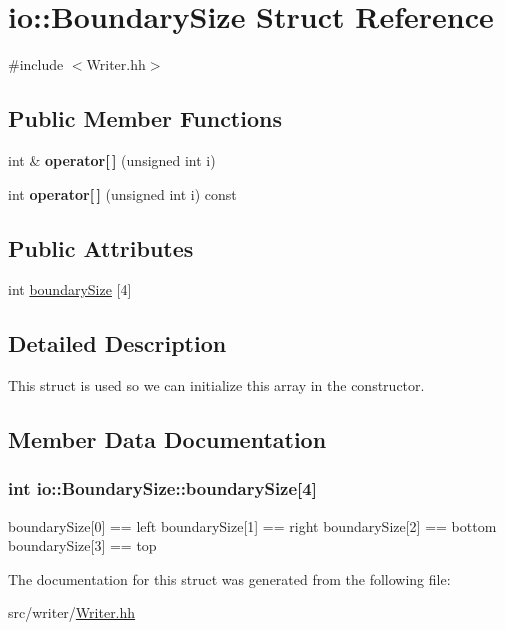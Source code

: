 \hypertarget{structio_1_1BoundarySize}{\section{io\-:\-:Boundary\-Size Struct Reference}
\label{structio_1_1BoundarySize}
}


{\ttfamily \#include $<$Writer.\-hh$>$}

\subsection*{Public Member Functions}
\begin{DoxyCompactItemize}
\item 
\hypertarget{structio_1_1BoundarySize_a4130ec88292d4a0eff9c402a90ef907d}{int \& {\bfseries operator\mbox{[}$\,$\mbox{]}} (unsigned int i)}\label{structio_1_1BoundarySize_a4130ec88292d4a0eff9c402a90ef907d}

\item 
\hypertarget{structio_1_1BoundarySize_ab7593d2a82890d5d255c30d1dd8fee08}{int {\bfseries operator\mbox{[}$\,$\mbox{]}} (unsigned int i) const }\label{structio_1_1BoundarySize_ab7593d2a82890d5d255c30d1dd8fee08}

\end{DoxyCompactItemize}
\subsection*{Public Attributes}
\begin{DoxyCompactItemize}
\item 
int \hyperlink{structio_1_1BoundarySize_ae1ac1aecc0b840076b68948dc2ceba8a}{boundary\-Size} \mbox{[}4\mbox{]}
\end{DoxyCompactItemize}


\subsection{Detailed Description}
This struct is used so we can initialize this array in the constructor. 

\subsection{Member Data Documentation}
\hypertarget{structio_1_1BoundarySize_ae1ac1aecc0b840076b68948dc2ceba8a}{
\subsubsection[{boundary\-Size}]{\setlength{\rightskip}{0pt plus 5cm}int io\-::\-Boundary\-Size\-::boundary\-Size\mbox{[}4\mbox{]}}}\label{structio_1_1BoundarySize_ae1ac1aecc0b840076b68948dc2ceba8a}
boundary\-Size\mbox{[}0\mbox{]} == left boundary\-Size\mbox{[}1\mbox{]} == right boundary\-Size\mbox{[}2\mbox{]} == bottom boundary\-Size\mbox{[}3\mbox{]} == top 

The documentation for this struct was generated from the following file\-:\begin{DoxyCompactItemize}
\item 
src/writer/\hyperlink{Writer_8hh}{Writer.\-hh}\end{DoxyCompactItemize}
